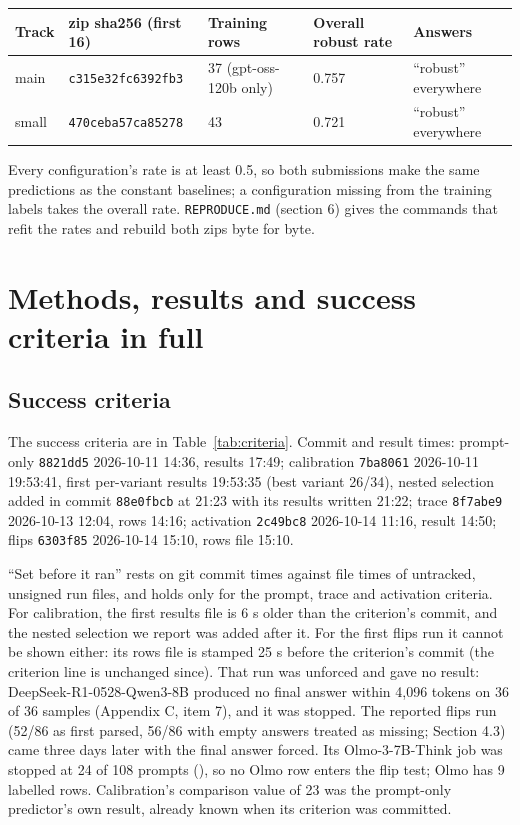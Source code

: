 \documentclass{article}
\begin{document}
\begin{center}
\small
\begin{tabular}{@{}lp{3.0cm}R{2.9cm}R{2.0cm}p{2.4cm}@{}}
\toprule
Track & zip sha256 (first 16) & Training rows & Overall robust rate & Answers \\
\midrule
main & \texttt{c315e32fc6392fb3} & 37 (gpt-oss-120b only) & 0.757 & ``robust'' everywhere \\
small & \texttt{470ceba57ca85278} & 43 & 0.721 & ``robust'' everywhere \\
\bottomrule
\end{tabular}
\end{center}

Every configuration's rate is at least 0.5, so both submissions make the same predictions as the
constant baselines; a configuration missing from the training labels takes the overall rate. \texttt{REPRODUCE.md} (section 6) gives the commands that refit the rates and rebuild both zips byte for byte.

\section{Methods, results and success criteria in full}

\subsection{Success criteria}\label{sec:B1}

The success criteria are in Table~\ref{tab:criteria}. Commit and result times: prompt-only \texttt{8821dd5} 2026-10-11
14:36, results 17:49; calibration \texttt{7ba8061} 2026-10-11 19:53:41, first per-variant results 19:53:35 (best variant 26/34), nested selection added in commit \texttt{88e0fbcb} at 21:23 with its results written 21:22; trace \texttt{8f7abe9}
2026-10-13 12:04, rows 14:16; activation \texttt{2c49bc8} 2026-10-14 11:16, result 14:50; flips \texttt{6303f85}
2026-10-14 15:10, rows file 15:10.

``Set before it ran'' rests on git commit times against file times of untracked, unsigned run files,
and holds only for the prompt, trace and activation criteria. For calibration, the first results file is 6 s older than the criterion's commit, and the nested selection we report was added after it. For the first flips run it
cannot be shown either: its rows file is stamped 25 s before the criterion's commit (the criterion line is
unchanged since). That run was unforced and gave no result: DeepSeek-R1-0528-Qwen3-8B produced no
final answer within 4,096 tokens on 36 of 36 samples (Appendix C, item 7), and it was stopped. The reported flips run (52/86 as first parsed, 56/86 with empty answers treated as missing; Section 4.3) came three days later with the final answer forced. Its Olmo-3-7B-Think job was stopped at
24 of 108 prompts (), so no Olmo row enters the flip test; Olmo
has 9 labelled rows. Calibration's comparison value of 23 was the
prompt-only predictor's own result, already known when its criterion was committed.
\end{document}
